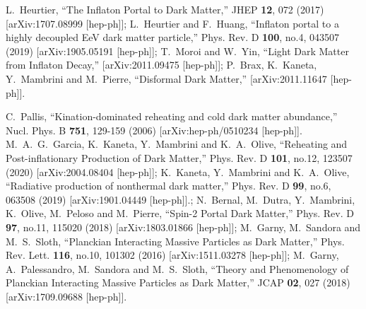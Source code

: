 \documentclass[%
aps,prd,nofootinbib,showkeys,a4paper,10pt
]{revtex4-2}
\begin{document}
\begin{thebibliography}{10}
L.~Heurtier,
``The Inflaton Portal to Dark Matter,''
JHEP \textbf{12}, 072 (2017)
[arXiv:1707.08999 [hep-ph]];
L.~Heurtier and F.~Huang,
``Inflaton portal to a highly decoupled EeV dark matter particle,''
Phys. Rev. D \textbf{100}, no.4, 043507 (2019)
[arXiv:1905.05191 [hep-ph]];
T.~Moroi and W.~Yin,
``Light Dark Matter from Inflaton Decay,''
[arXiv:2011.09475 [hep-ph]];
P.~Brax, K.~Kaneta, Y.~Mambrini and M.~Pierre,
``Disformal Dark Matter,''
[arXiv:2011.11647 [hep-ph]].



C.~Pallis,
``Kination-dominated reheating and cold dark matter abundance,''
Nucl. Phys. B \textbf{751}, 129-159 (2006)
[arXiv:hep-ph/0510234 [hep-ph]]. 
M.~A.~G.~Garcia, K.~Kaneta, Y.~Mambrini and K.~A.~Olive,
``Reheating and Post-inflationary Production of Dark Matter,''
Phys. Rev. D \textbf{101}, no.12, 123507 (2020)
[arXiv:2004.08404 [hep-ph]];
K.~Kaneta, Y.~Mambrini and K.~A.~Olive,
``Radiative production of nonthermal dark matter,''
Phys. Rev. D \textbf{99}, no.6, 063508 (2019)
[arXiv:1901.04449 [hep-ph]].;
N.~Bernal, M.~Dutra, Y.~Mambrini, K.~Olive, M.~Peloso and M.~Pierre,
``Spin-2 Portal Dark Matter,''
Phys. Rev. D \textbf{97}, no.11, 115020 (2018)
[arXiv:1803.01866 [hep-ph]];
M.~Garny, M.~Sandora and M.~S.~Sloth,
``Planckian Interacting Massive Particles as Dark Matter,''
Phys. Rev. Lett. \textbf{116}, no.10, 101302 (2016)
[arXiv:1511.03278 [hep-ph]];
M.~Garny, A.~Palessandro, M.~Sandora and M.~S.~Sloth,
``Theory and Phenomenology of Planckian Interacting Massive Particles as Dark Matter,''
JCAP \textbf{02}, 027 (2018)
[arXiv:1709.09688 [hep-ph]].






\end{thebibliography}
\end{document}
